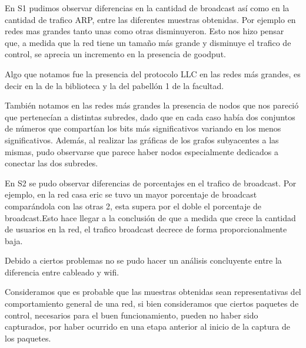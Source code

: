	En S1 pudimos observar diferencias en la cantidad de broadcast así
    como en la cantidad de trafico ARP, entre las diferentes muestras
    obtenidas. Por ejemplo en redes mas grandes tanto unas como otras
    disminuyeron. Esto nos hizo pensar que, a medida que la red tiene
    un tamaño más grande y disminuye el trafico de control, se aprecia
    un incremento en la presencia de goodput.

    
    Algo que notamos fue la presencia del protocolo LLC en las redes
    más grandes, es decir en la de la biblioteca y la del pabellón 1
    de la facultad.

    También notamos en las redes más grandes la presencia de nodos que
    nos pareció que pertenecían a distintas subredes, dado que en cada
    caso había dos conjuntos de números que compartían los bits más
    significativos variando en los menos significativos. Además, al
    realizar las gráficas de los grafos subyacentes a las mismas,
    pudo observarse que parece haber nodos especialmente dedicados a
    conectar las dos subredes.

    En S2 se pudo observar diferencias de porcentajes en el trafico de
    broadcast. Por ejemplo, en la red casa eric se tuvo un mayor
    porcentaje de broadcast comparándola con las otras 2, esta supera
    por el doble el porcentaje de broadcast.Esto hace llegar a la
    conclusión de que a medida que crece la cantidad de usuarios en la
    red, el trafico broadcast decrece de forma proporcionalmente baja.


Debido a ciertos problemas no se pudo hacer un análisis concluyente entre la diferencia entre cableado y wifi.

Consideramos que es probable que las muestras obtenidas sean
representativas del comportamiento general de una red, si bien
consideramos que ciertos paquetes de control, necesarios para el buen
funcionamiento, pueden no haber sido capturados, por haber ocurrido en
una etapa anterior al inicio de la captura de los paquetes.



